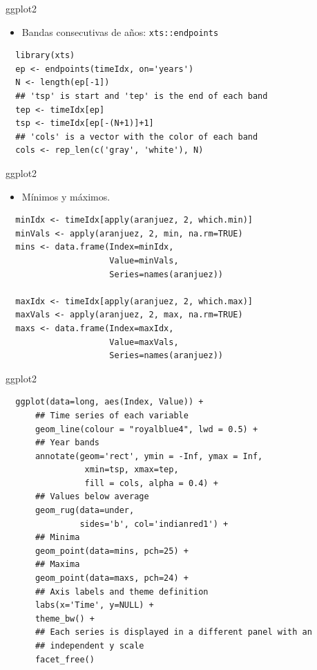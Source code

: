 \documentclass[xcolor={usenames,svgnames,dvipsnames}]{beamer}
\begin{document}
\begin{frame}[fragile,label=sec-2-3-5]{ggplot2}
 \begin{itemize}
\item Bandas consecutivas de años: \texttt{xts::endpoints}
\end{itemize}

\lstset{language=R,label= ,caption= ,numbers=none}
\begin{lstlisting}
  library(xts)
  ep <- endpoints(timeIdx, on='years')
  N <- length(ep[-1])
  ## 'tsp' is start and 'tep' is the end of each band
  tep <- timeIdx[ep]
  tsp <- timeIdx[ep[-(N+1)]+1]
  ## 'cols' is a vector with the color of each band
  cols <- rep_len(c('gray', 'white'), N)
\end{lstlisting}
\end{frame}
\begin{frame}[fragile,label=sec-2-3-6]{ggplot2}
 \begin{itemize}
\item Mínimos y máximos.
\end{itemize}
\lstset{language=R,label= ,caption= ,numbers=none}
\begin{lstlisting}
  minIdx <- timeIdx[apply(aranjuez, 2, which.min)]
  minVals <- apply(aranjuez, 2, min, na.rm=TRUE)
  mins <- data.frame(Index=minIdx,
                     Value=minVals,
                     Series=names(aranjuez))
  
  maxIdx <- timeIdx[apply(aranjuez, 2, which.max)]
  maxVals <- apply(aranjuez, 2, max, na.rm=TRUE)
  maxs <- data.frame(Index=maxIdx,
                     Value=maxVals,
                     Series=names(aranjuez))
\end{lstlisting}
\end{frame}

\begin{frame}[fragile,label=sec-2-3-7]{ggplot2}
 \lstset{language=R,label= ,caption= ,numbers=none}
\begin{lstlisting}
  ggplot(data=long, aes(Index, Value)) +
      ## Time series of each variable
      geom_line(colour = "royalblue4", lwd = 0.5) +
      ## Year bands
      annotate(geom='rect', ymin = -Inf, ymax = Inf,
                xmin=tsp, xmax=tep,
                fill = cols, alpha = 0.4) +
      ## Values below average
      geom_rug(data=under,
               sides='b', col='indianred1') +
      ## Minima
      geom_point(data=mins, pch=25) +
      ## Maxima
      geom_point(data=maxs, pch=24) +
      ## Axis labels and theme definition
      labs(x='Time', y=NULL) +
      theme_bw() +
      ## Each series is displayed in a different panel with an
      ## independent y scale
      facet_free()
\end{lstlisting}
\end{frame}
\end{document}
